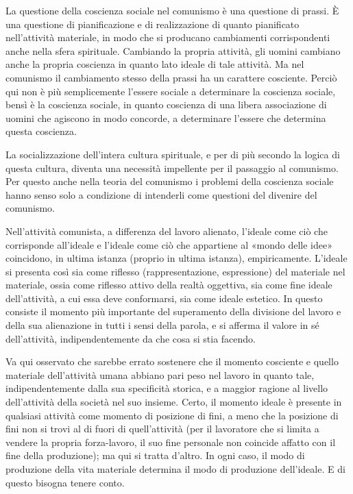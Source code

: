 \documentclass[12pt,a4paper,openany]{book}
\begin{document}
La questione della coscienza sociale nel comunismo è una questione di prassi. È una questione di pianificazione e di realizzazione di quanto pianificato nell'attività materiale, in modo che si producano cambiamenti corrispondenti anche nella sfera spirituale. Cambiando la propria attività, gli uomini cambiano anche la propria coscienza in quanto lato ideale di tale attività. Ma nel comunismo il cambiamento stesso della prassi ha un carattere cosciente. Perciò qui non è più semplicemente l'essere sociale a determinare la coscienza sociale, bensì è la coscienza sociale, in quanto coscienza di una libera associazione di uomini che agiscono in modo concorde, a determinare l'essere che determina questa coscienza.

La socializzazione dell'intera cultura spirituale, e per di più secondo la logica di questa cultura, diventa una necessità impellente per il passaggio al comunismo. Per questo anche nella teoria del comunismo i problemi della coscienza sociale hanno senso solo a condizione di intenderli come questioni del divenire del comunismo.

Nell'attività comunista, a differenza del lavoro alienato, l'ideale come ciò che corrisponde all'ideale e l'ideale come ciò che appartiene al «mondo delle idee» coincidono, in ultima istanza (proprio in ultima istanza), empiricamente. L'ideale si presenta così sia come riflesso (rappresentazione, espressione) del materiale nel materiale, ossia come riflesso attivo della realtà oggettiva, sia come fine ideale dell'attività, a cui essa deve conformarsi, sia come ideale estetico. In questo consiste il momento più importante del superamento della divisione del lavoro e della sua alienazione in tutti i sensi della parola, e si afferma il valore in sé dell'attività, indipendentemente da che cosa si stia facendo.

Va qui osservato che sarebbe errato sostenere che il momento cosciente e quello materiale dell'attività umana abbiano pari peso nel lavoro in quanto tale, indipendentemente dalla sua specificità storica, e a maggior ragione al livello dell'attività della società nel suo insieme. Certo, il momento ideale è presente in qualsiasi attività come momento di posizione di fini, a meno che la posizione di fini non si trovi al di fuori di quell'attività (per il lavoratore che si limita a vendere la propria forza-lavoro, il suo fine personale non coincide affatto con il fine della produzione); ma qui si tratta d'altro. In ogni caso, il modo di produzione della vita materiale determina il modo di produzione dell'ideale. E di questo bisogna tenere conto.
\end{document}
